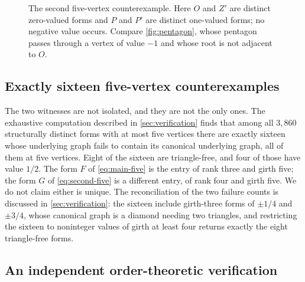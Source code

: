 \documentclass[11pt,a4paper]{article}
\numberwithin{equation}{section}
\theoremstyle{definition}
\theoremstyle{remark}
\begin{document}
\begin{figure}[htbp]
\centering
{}
\caption{The second five-vertex counterexample. Here $O$ and $Z'$ are distinct
zero-valued forms and $P$ and $P'$ are distinct one-valued forms; no negative
value occurs. Compare \cref{fig:pentagon}, whose pentagon passes through a
vertex of value $-1$ and whose root is not adjacent to $O$.}
\label{fig:second-pentagon}
\end{figure}

\subsection{Exactly sixteen five-vertex counterexamples}

The two witnesses are not isolated, and they are not the only ones. The
exhaustive computation described in \cref{sec:verification} finds that among all
$3{,}860$ structurally distinct forms with at most five vertices there are
exactly sixteen whose underlying graph fails to contain its canonical underlying
graph, all of them at five vertices. Eight of the sixteen are triangle-free, and
four of those have value $1/2$. The form $F$ of \eqref{eq:main-five} is the
entry of rank three and girth five; the form $G$ of \eqref{eq:second-five} is a
different entry, of rank four and girth five. We do not claim either is unique.
The reconciliation of the two failure counts is discussed in
\cref{sec:verification}: the sixteen include girth-three forms of $\pm1/4$ and
$\pm3/4$, whose canonical graph is a diamond needing two triangles, and
restricting the sixteen to noninteger values of girth at least four returns
exactly the eight triangle-free forms.

\subsection{An independent order-theoretic verification}
\label{sec:comparison}
\end{document}
